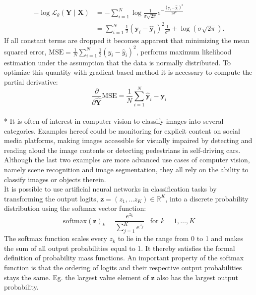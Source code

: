 \documentclass[a4paper,11pt]{article} %
\begin{document}
\begin{equation}
  \begin{split} %
  -\log \mathcal{L}_{\theta}(\mathbf{Y} \mid \mathbf{X}) & = -\sum_{i=1}^{N} \log \frac{1}{\sigma \sqrt{2 \pi}} e^{-\frac{(\mathbf{y}_i - \hat{\mathbf{y}}_i)^{2}}{2 \sigma^{2}}} \\ 
  & = \sum_{i=1}^{N} \frac{1}{2}(\mathbf{y}_i - \hat{\mathbf{y}}_i)^2 \frac{1}{\sigma^2} + \log\left( \sigma \sqrt{2\pi} \right).
  \end{split}
\end{equation}
If all constant terms are dropped it becomes apparent that minimizing the mean squared error, $\text{MSE} = \frac{1}{N}\sum_{i=1}^{N} \frac{1}{2}(y_i - \hat{y}_i)^2$, performs maximum likelihood estimation under the assumption that the data is normally distributed. To optimize this quantity with gradient based method it is necessary to compute the partial derivative:
\begin{equation} \label{eq:regression-loss-deriv}
  \frac{\partial}{\partial \hat{\mathbf{Y}}}\text{MSE} = \frac{1}{N}\sum_{i=1}^{N} \hat{\mathbf{y}}_i - \mathbf{y}_i
\end{equation}
\\*
It is often of interest in computer vision to classify images into several categories. Examples hereof could be monitoring for explicit content on social media platforms, making images accessible for visually impaired by detecting and reading aloud the image contents or detecting pedestrians in self-driving cars. Although the last two examples are more advanced use cases of computer vision, namely scene recognition and image segmentation, they all rely on the ability to classify images or objects therein. \\
It is possible to use artificial neural networks in classification tasks by transforming the output logits, $\mathbf{z} = (z_1, \ldots z_K) \in \mathbb{R}^K$, into a discrete probability distribution using the softmax vector function:
\begin{equation} \label{eq:softmax}
  \text{softmax}(\mathbf{z})_k = \frac{e^{z_k}}{\sum_{j=1}^{K}{e^{z_j}}} \hspace{10pt} \text{for } k = 1,\ldots,K 
\end{equation}
The softmax function scales every $z_k$ to lie in the range from 0 to 1 and makes the sum of all output probabilities equal to 1. It thereby satisfies the formal definition of probability mass functions. An important property of the softmax function is that the ordering of logits and their respective output probabilities stays the same. Eg. the largest value element of $\mathbf{z}$ also has the largest output probability. \\
\end{document}
